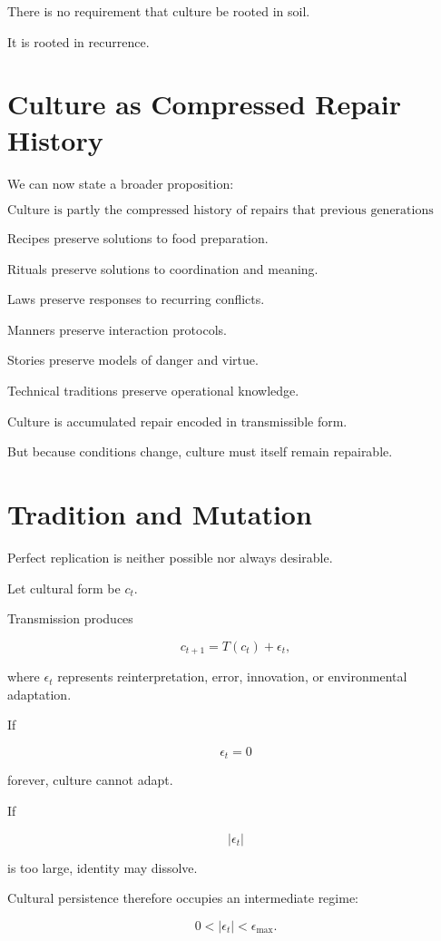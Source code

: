 \documentclass[11pt,oneside]{book}
\theoremstyle{definition}
\theoremstyle{remark}
\begin{document}
There is no requirement that culture be rooted in soil.

It is rooted in recurrence.

\section{Culture as Compressed Repair History}

We can now state a broader proposition:

\[
\boxed{
\text{Culture is partly the compressed history of repairs that previous generations found worth repeating.}
}
\]

Recipes preserve solutions to food preparation.

Rituals preserve solutions to coordination and meaning.

Laws preserve responses to recurring conflicts.

Manners preserve interaction protocols.

Stories preserve models of danger and virtue.

Technical traditions preserve operational knowledge.

Culture is accumulated repair encoded in transmissible form.

But because conditions change, culture must itself remain repairable.

\section{Tradition and Mutation}

Perfect replication is neither possible nor always desirable.

Let cultural form be \(c_t\).

Transmission produces

\[
c_{t+1}
=
T(c_t)+\epsilon_t,
\]

where \(\epsilon_t\) represents reinterpretation, error, innovation, or environmental adaptation.

If

\[
\epsilon_t=0
\]

forever, culture cannot adapt.

If

\[
|\epsilon_t|
\]

is too large, identity may dissolve.

Cultural persistence therefore occupies an intermediate regime:

\[
0<|\epsilon_t|<\epsilon_{\max}.
\]
\end{document}
